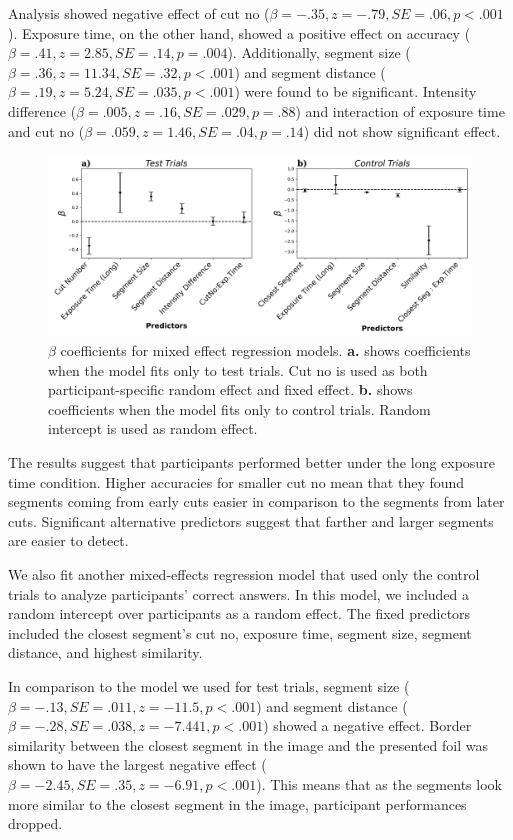 \documentclass{article}
\begin{document}
Analysis showed negative effect of cut no ($\beta = -.35, z = -.79, SE = .06, p < .001$). Exposure time, on the other hand, showed a positive effect on accuracy ($\beta = .41, z = 2.85, SE = .14, p = .004$). Additionally, segment size ($\beta = .36, z = 11.34, SE = .32,  p < .001$) and segment distance ($\beta = .19, z = 5.24, SE = .035, p < .001$) were found to be significant. Intensity difference ($\beta = .005, z = .16, SE = .029, p = .88$) and interaction of exposure time and cut no ($\beta = .059, z = 1.46, SE = .04, p = .14$) did not show significant effect.

\begin{figure}[!hb]
    \hspace*{-1.2cm}
    \includegraphics[width=1.2\textwidth]{plots/coefficients_rndInt.png}    
    \caption{$\beta$ coefficients for mixed effect regression models. \textbf{a.} shows coefficients when the model fits only to test trials. Cut no is used as both participant-specific random effect and fixed effect. \textbf{b.} shows coefficients when the model fits only to control trials. Random intercept is used as random effect.}
    \label{fig:coeffs_rndInt}
\end{figure}

The results suggest that participants performed better under the long exposure time condition. Higher accuracies for smaller cut no mean that they found segments coming from early cuts easier in comparison to the segments from later cuts. Significant alternative predictors suggest that farther and larger segments are easier to detect.

We also fit another mixed-effects regression model that used only the control trials to analyze participants' correct answers. In this model, we included a random intercept over participants as a random effect. The fixed predictors included the closest segment's cut no, exposure time, segment size, segment distance, and highest similarity. 

In comparison to the model we used for test trials, segment size ($\beta = -.13, SE = .011, z = -11.5, p < .001$) and segment distance ($\beta = -.28, SE = .038, z = -7.441, p < .001$) showed a negative effect. Border similarity between the closest segment in the image and the presented foil was shown to have the largest negative effect ($\beta = -2.45, SE = .35, z = -6.91, p < .001 $). This means that as the segments look more similar to the closest segment in the image, participant performances dropped.
\end{document}
